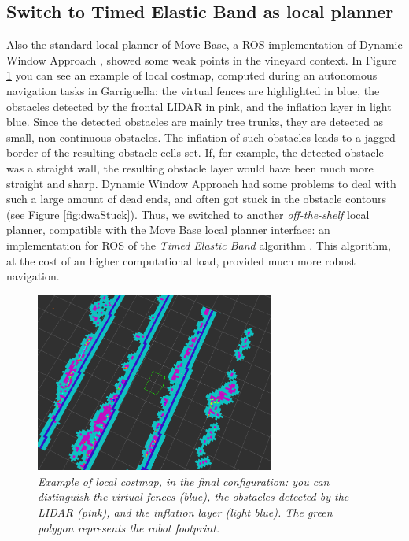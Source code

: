 \subsection{Switch to Timed Elastic Band as local planner}
Also the standard local planner of Move Base, a \ac{ROS} implementation of Dynamic Window Approach \parencite{dwa}, showed some weak points in the vineyard context. In Figure \ref{fig:localCostmap} you can see an example of local costmap, computed during an autonomous navigation tasks in Garriguella: the virtual fences are highlighted in blue, the obstacles detected by the frontal \ac{LIDAR} in pink, and the inflation layer in light blue. Since the detected obstacles are mainly tree trunks, they are detected as small, non continuous obstacles. The inflation of such obstacles leads to a jagged border of the resulting obstacle cells set. If, for example, the detected obstacle was a straight wall, the resulting obstacle layer would have been much more straight and sharp. Dynamic Window Approach had some problems to deal with such a large amount of dead ends, and often got stuck in the obstacle contours (see Figure \ref{fig:dwaStuck}). Thus, we switched to another \textit{off-the-shelf} local planner, compatible with the Move Base local planner interface: an implementation for \ac{ROS} of the \textit{Timed Elastic Band} algorithm \parencite{teb}. This algorithm, at the cost of an higher computational load, provided much more robust navigation.

\begin{figure}
	\centering
	\includegraphics[width=0.7\textwidth]{Images/localization/localCostmap_highlighted.png}
	\caption{\textit{Example of local costmap, in the final configuration: you can distinguish the virtual fences (blue), the obstacles detected by the \ac{LIDAR} (pink), and the inflation layer (light blue). The green polygon represents the robot footprint.}}
	\label{fig:localCostmap}
\end{figure}

